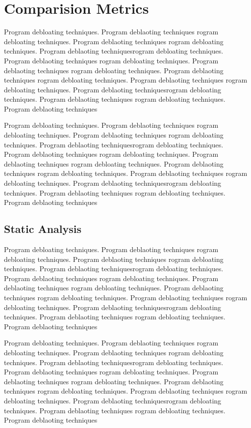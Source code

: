 \documentclass{relatorio}
\begin{document}
\section{Comparision Metrics}%
\label{Tools}

Program debloating techniques. Program deblaoting techniques rogram debloating techniques. Program deblaoting techniques
rogram debloating techniques. Program deblaoting techniquesrogram debloating techniques. Program deblaoting techniques
rogram debloating techniques. Program deblaoting techniques rogram debloating techniques. Program deblaoting techniques
rogram debloating techniques. Program deblaoting techniques 
rogram debloating techniques. Program deblaoting techniquesrogram debloating techniques. Program deblaoting techniques
rogram debloating techniques. Program deblaoting techniques

Program debloating techniques. Program deblaoting techniques rogram debloating techniques. Program deblaoting techniques
rogram debloating techniques. Program deblaoting techniquesrogram debloating techniques. Program deblaoting techniques
rogram debloating techniques. Program deblaoting techniques rogram debloating techniques. Program deblaoting techniques
rogram debloating techniques. Program deblaoting techniques 
rogram debloating techniques. Program deblaoting techniquesrogram debloating techniques. Program deblaoting techniques
rogram debloating techniques. Program deblaoting techniques


\subsection{Static Analysis}%
\label{Tools}

Program debloating techniques. Program deblaoting techniques rogram debloating techniques. Program deblaoting techniques
rogram debloating techniques. Program deblaoting techniquesrogram debloating techniques. Program deblaoting techniques
rogram debloating techniques. Program deblaoting techniques rogram debloating techniques. Program deblaoting techniques
rogram debloating techniques. Program deblaoting techniques 
rogram debloating techniques. Program deblaoting techniquesrogram debloating techniques. Program deblaoting techniques
rogram debloating techniques. Program deblaoting techniques

Program debloating techniques. Program deblaoting techniques rogram debloating techniques. Program deblaoting techniques
rogram debloating techniques. Program deblaoting techniquesrogram debloating techniques. Program deblaoting techniques
rogram debloating techniques. Program deblaoting techniques rogram debloating techniques. Program deblaoting techniques
rogram debloating techniques. Program deblaoting techniques 
rogram debloating techniques. Program deblaoting techniquesrogram debloating techniques. Program deblaoting techniques
rogram debloating techniques. Program deblaoting techniques
\end{document}
